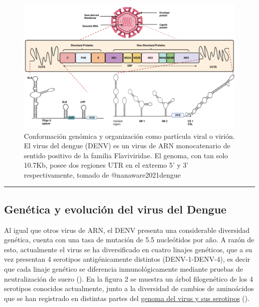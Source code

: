 \documentclass[
  12pt, krantz2,
  spanish,
]{krantz}
\begin{document}
\begin{figure}
\includegraphics[width=0.8\linewidth]{figures/DenvFigura1} \caption{Conformación genómica y organización como partícula viral o virión. El virus del dengue (DENV) es un virus de ARN monocatenario de sentido positivo de la familia Flaviviridae. El genoma, con tan solo 10.7Kb,  posee dos regiones UTR en el extremo 5’ y 3’ respectivamente, tomado de @nanaware2021dengue}\label{fig:genomeDenv}
\end{figure}

\begin{center}\rule{0.5\linewidth}{0.5pt}\end{center}

\hypertarget{genuxe9tica-y-evoluciuxf3n-del-virus-del-dengue}{%
\subsection{Genética y evolución del virus del Dengue}\label{genuxe9tica-y-evoluciuxf3n-del-virus-del-dengue}}

Al igual que otros virus de ARN, el DENV presenta una considerable diversidad genética, cuenta con una tasa de mutación de 5.5 nucleótidos por año. A razón de esto, actualmente el virus se ha diversificado en cuatro linajes genéticos, que a su vez presentan 4 serotipos antigénicamente distintos (DENV-1-DENV-4), es decir que cada linaje genético se diferencia inmunológicamente mediante pruebas de neutralización de suero (\citet{nanaware2021dengue}). En la figura 2 se muestra un árbol filogenético de los 4 serotipos conocidos actualmente, junto a la diversidad de cambios de aminoácidos que se han registrado en distintas partes del \href{https://nextstrain.org/dengue/all}{genoma del virus y sus serotipos} (\citet{hadfield2018nextstrain}).
\end{document}
